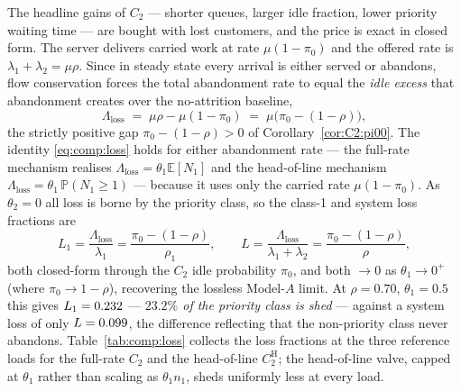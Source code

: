 \documentclass{article}
\numberwithin{equation}{section}
\newcommand{\CH}{C_2^{\mathrm{H}}}
\begin{document}
The headline gains of $C_2$ --- shorter queues, larger idle fraction, lower priority waiting
time --- are bought with lost customers, and the price is exact in closed form. The server
delivers carried work at rate $\mu(1-\pi_0)$ and the offered rate is $\lambda_1+\lambda_2=\mu\rho$.
Since in steady state every arrival is either served or abandons, flow conservation forces the
total abandonment rate to equal the \emph{idle excess} that abandonment creates over the
no-attrition baseline,
\begin{equation}\label{eq:comp:loss}
  \Lambda_{\mathrm{loss}}
  \;=\;\mu\rho-\mu(1-\pi_0)
  \;=\;\mu\bigl(\pi_0-(1-\rho)\bigr),
\end{equation}
the strictly positive gap $\pi_0-(1-\rho)>0$ of Corollary~\ref{cor:C2:pi00}. The identity
\eqref{eq:comp:loss} holds for either abandonment rate --- the full-rate mechanism realises
$\Lambda_{\mathrm{loss}}=\theta_1\mathbb{E}[N_1]$ and the head-of-line mechanism
$\Lambda_{\mathrm{loss}}=\theta_1\,\mathbb{P}(N_1\ge1)$ --- because it uses only the carried
rate $\mu(1-\pi_0)$. As $\theta_2=0$ all loss is borne by the priority class, so the class-1
and system loss fractions are
\begin{equation}\label{eq:comp:lossfrac}
  L_1=\frac{\Lambda_{\mathrm{loss}}}{\lambda_1}=\frac{\pi_0-(1-\rho)}{\rho_1},
  \qquad
  L=\frac{\Lambda_{\mathrm{loss}}}{\lambda_1+\lambda_2}=\frac{\pi_0-(1-\rho)}{\rho},
\end{equation}
both closed-form through the $C_2$ idle probability $\pi_0$, and both $\to0$ as
$\theta_1\to0^+$ (where $\pi_0\to1-\rho$), recovering the lossless Model-$A$ limit. At
$\rho=0.70$, $\theta_1=0.5$ this gives $L_1=0.232$ --- \emph{$23.2\%$ of the priority
class is shed} --- against a system loss of only $L=0.099$, the difference reflecting
that the non-priority class never abandons. Table~\ref{tab:comp:loss} collects the loss fractions
at the three reference loads for the full-rate $C_2$ and the head-of-line $\CH$; the head-of-line
valve, capped at $\theta_1$ rather than scaling as $\theta_1 n_1$, sheds uniformly less at every
load.
\end{document}
